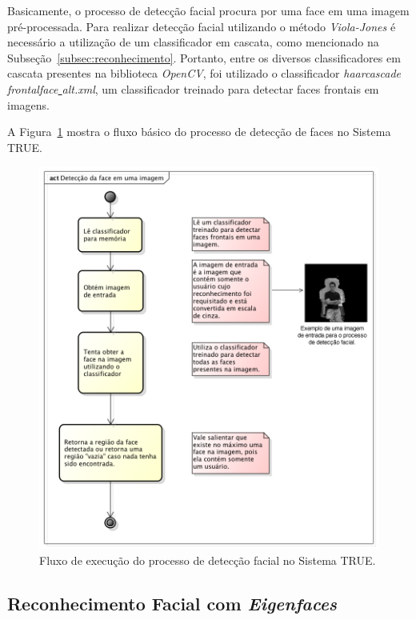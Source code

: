 		Basicamente, o processo de detecção facial procura por uma face em uma imagem pré-processada. Para realizar detecção facial utilizando o método \textit{Viola-Jones} é necessário a utilização de um classificador em cascata, como mencionado na Subseção~\ref{subsec:reconhecimento}. Portanto, entre os diversos classificadores em cascata presentes na biblioteca \textit{OpenCV}, foi utilizado o classificador \textit{haarcascade\underline{ }frontalface\underline{ }alt.xml}, um classificador treinado para detectar faces frontais em imagens.

		A Figura~\ref{fig:diagrama-deteccao} mostra o fluxo básico do processo de detecção de faces no Sistema TRUE.

			\begin{figure}[H]
			\begin{center}
				\includegraphics[scale=0.7]{figuras/4.ProblemaEProposta/diagrama-detectar-face.png}
			\end{center}
			\caption{Fluxo de execução do processo de detecção facial no Sistema TRUE.}
			\label{fig:diagrama-deteccao}
		\end{figure}

	\subsection{Reconhecimento Facial com \textit{Eigenfaces}}

